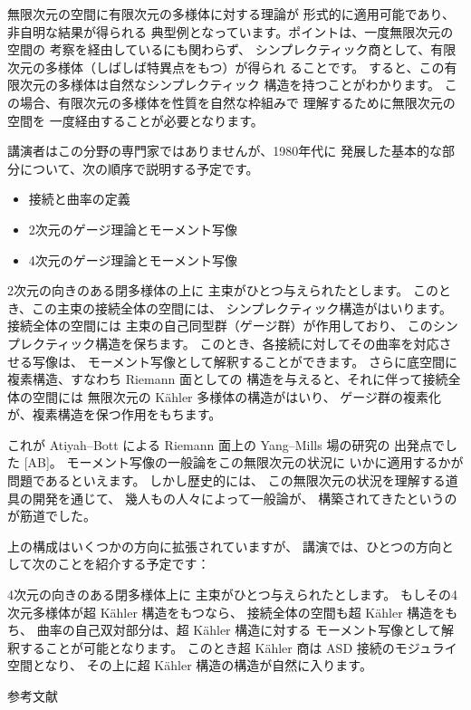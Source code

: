 \documentclass[uplatex,dvipdfmx]{jlreq}
\begin{document}
無限次元の空間に有限次元の多様体に対する理論が
形式的に適用可能であり、非自明な結果が得られる
典型例となっています。ポイントは、一度無限次元の空間の
考察を経由しているにも関わらず、
シンプレクティック商として、有限次元の多様体（しばしば特異点をもつ）が得られ
ることです。
すると、この有限次元の多様体は自然なシンプレクティック
構造を持つことがわかります。
この場合、有限次元の多様体を性質を自然な枠組みで
理解するために無限次元の空間を
一度経由することが必要となります。

講演者はこの分野の専門家ではありませんが、1980年代に
発展した基本的な部分について、次の順序で説明する予定です。

\begin{itemize}
\item
接続と曲率の定義
\item
2次元のゲージ理論とモーメント写像
\item
4次元のゲージ理論とモーメント写像
\end{itemize}

2次元の向きのある閉多様体の上に
主束がひとつ与えられたとします。
このとき、この主束の接続全体の空間には、
シンプレクティック構造がはいります。
接続全体の空間には
主束の自己同型群（ゲージ群）が作用しており、
このシンプレクティック構造を保ちます。
このとき、各接続に対してその曲率を対応させる写像は、
モーメント写像として解釈することができます。
さらに底空間に複素構造、すなわち Riemann 面としての
構造を与えると、それに伴って接続全体の空間には
無限次元の Kähler 多様体の構造がはいり、
ゲージ群の複素化が、複素構造を保つ作用をもちます。

これが Atiyah--Bott による Riemann 面上の Yang--Mills 場の研究の
出発点でした [AB]。
モーメント写像の一般論をこの無限次元の状況に
いかに適用するかが問題であるといえます。
しかし歴史的には、
この無限次元の状況を理解する道具の開発を通じて、
幾人もの人々によって一般論が、
構築されてきたというのが筋道でした。

上の構成はいくつかの方向に拡張されていますが、
講演では、ひとつの方向として次のことを紹介する予定です：

4次元の向きのある閉多様体上に
主束がひとつ与えられたとします。
もしその4次元多様体が超 Kähler 構造をもつなら、
接続全体の空間も超 Kähler 構造をもち、
曲率の自己双対部分は、超 Kähler 構造に対する
モーメント写像として解釈することが可能となります。
このとき超 Kähler 商は ASD 接続のモジュライ空間となり、
その上に超 Kähler 構造の構造が自然に入ります。

\vspace{3mm}

\noindent
参考文献
\end{document}

